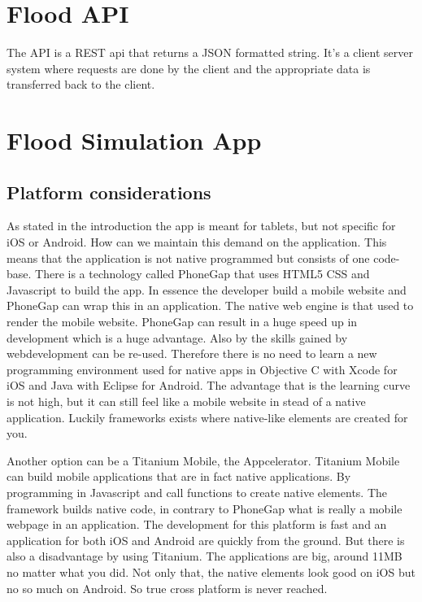 \documentclass[10pt,a4paper]{article}
\begin{document}
\section{Flood API}
The API is a REST api that returns a JSON formatted string. It's a client server system where requests are done by the client and the appropriate data is transferred back to the client. 

\section{Flood Simulation App}
 

\subsection{Platform considerations}
As stated in the introduction the app is meant for tablets, but not specific for iOS or Android. How can we maintain this demand on the application. This means that the application is not native programmed but consists of one code-base. There is a technology called PhoneGap that uses HTML5 CSS and Javascript to build the app. In essence the developer build a mobile website and PhoneGap can wrap this in an application. The native web engine is that used to render the mobile website. PhoneGap can result in a huge speed up in development which is a huge advantage. Also by the skills gained by webdevelopment can be re-used. Therefore there is no need to learn a new programming environment used for native apps in Objective C with Xcode for iOS and Java with Eclipse for Android. The advantage that is the learning curve is not high, but it can still feel like a mobile website in stead of a native application. Luckily frameworks exists where native-like elements are created for you. 

Another option can be a Titanium Mobile, the Appcelerator. Titanium Mobile can build mobile applications that are in fact native applications. By programming in Javascript and call functions to create native elements. The framework builds native code, in contrary to PhoneGap what is really a mobile webpage in an application. The development for this platform is fast and an application for both iOS and Android are quickly from the ground. But there is also a disadvantage by using Titanium. The applications are big, around 11MB no matter what you did. Not only that, the native elements look good on iOS but no so much on Android. So true cross platform is never reached.
\end{document}
